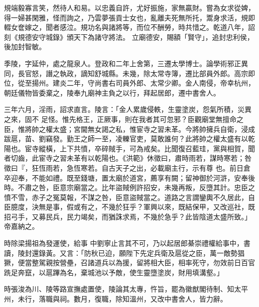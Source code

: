 \begin{pinyinscope}
 規端毅寡言笑，然待人和易。以忠義自許，尤好振施，家無贏財。嘗為女求從婢，得一婦甚閑雅，怪而詢之，乃雲夢張貢士女也，亂離夫死無所托，鬻身求活，規即輟女奩嫁之，聞者感泣。規功名與諸將等，而位不酬勞，時共惜之。乾道八年，詔刻《規德安守城錄》頒天下為諸守將法。
 立廟德安，賜額「賢守」，追封忠利侯，後加封智敏。



 季陵，字延仲，處之龍泉人。登政和二年上舍第，三遷太學博士。論學術邪正異同，長官怒，譖之執政，謫知舒城縣。未幾，除太常寺簿，遷比部員外郎。高宗即位，從至揚州。建炎二年，守尚書右司員外郎、太常少卿。金人南侵，帝幸杭州，朝廷儀物皆委棄之，陵奉九廟神主負之以行，拜起居郎，遷中書舍人。



 三年六月，淫雨，詔求直言。陵言：「金人累歲侵軼，生靈塗炭，怨氣所積，災異之來，固不
 足怪。惟先格王，正厥事，則在我者其可忽邪？臣觀廟堂無擅命之臣，惟將帥之權太盛；宮閫無女謁之私，惟宦寺之習未革。今將帥擁兵自衛，浸成跋扈，苗、劉竊發。勤王之師一至，凌轢官吏，莫敢誰何？此將帥之權太盛有以乾陽也。宦寺縱橫，上下共憤，卒碎賊手，可為戒矣。比聞復召藍珪，黨與相賀，聞者切齒，此宦寺之習未革有以乾陽也。《洪範》休徵曰，肅時雨若，謀時寒若；咎徵曰『，狂恆雨若，急恆寒若。自古天子之出，必載廟主行，示有尊
 也。前日倉卒迎奉，不能如禮。既至錢塘，置太廟於道宮，薦享有闕；留神御於河滸，安奉後時。不肅之咎，臣意宗廟當之。比年盜賊例許招安，未幾再叛，反墮其計。忠臣之憤不雪，赤子之冤莫報，不謀之咎，臣意盜賊當之。道路之言謂鑾輿不久居此，自臣臆度，決無是事，假或有之，不幾於狂乎？軍興以來，既結保甲，又改巡社，既招弓手，又募民兵，民力竭矣，而猶誅求焉，不幾於急乎？此皆陰道太盛所致。」帝嘉納之。



 時除梁揚祖為發運使，給事
 中劉寧止言其不可，乃以起居郎綦崇禮權給事中，書讀，陵封還錄黃。又言：「防秋已迫，願陛下先定兵衛及扈從之臣，萬一敵勢猖獗，便當整駕親按營壘，召諸道兵以為援，留將相大臣，相率死守，勿效前日百官跣足奔竄，以扈蹕為名，棄城池以予敵，使生靈墮塗炭，財用填溝壑。」



 時張浚為川、陵等路宣撫處置使，陵論其太專，忤旨，罷為徽猷閣待制、知太平州，未行，落職與祠。數月，復職，除知溫州，又改中書舍人，皆力辭。




\end{pinyinscope}
